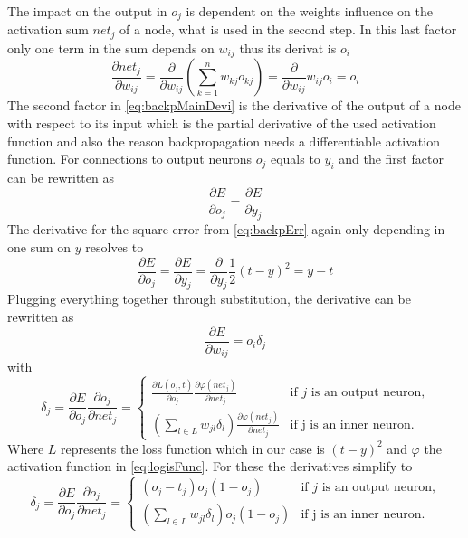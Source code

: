 The impact on the output in $o_j$ is dependent on the weights influence on the activation sum $net_j$ of a node, what is used in the second step. In this last factor only one term in the sum depends on $w_{ij}$ thus its derivat is $o_i$
\begin{equation}\label{eq:backp3s}
  \frac{\partial net_j}{\partial w_{ij}} =  \frac{\partial}{\partial w_{ij}} \left( \sum_{k=1}^n w_{kj} o_{kj} \right) = \frac{\partial}{\partial w_{ij}} w_{ij}o_i = o_i
\end{equation}
The second factor in \autoref{eq:backpMainDevi} is the derivative of the output of a node with respect to its input which is the partial derivative of the used activation function and also the reason backpropagation needs a differentiable activation function.
\newline
For connections to output neurons $o_j$ equals to $y_i$ and the first factor can be rewritten as
\begin{equation}
  \frac{\partial E}{\partial o_j} = \frac{\partial E}{\partial y_j} 
\end{equation}
The derivative for the square error from \autoref{eq:backpErr} again only depending in one sum on $y$ resolves to
\begin{equation}\label{eq:backpResEDev}
  \frac{\partial E}{\partial o_j} = \frac{\partial E}{\partial y_j} =
  \frac{\partial}{\partial y_j} \frac{1}{2}(t-y)^2 = y - t 
\end{equation}
Plugging everything together through substitution, the derivative can be rewritten as 
\begin{equation}
  \frac{\partial E}{\partial w_{ij}} = o_i \delta_j
\end{equation}
with
\begin{equation}
  \delta_j = \frac{\partial E}{\partial o_j}\frac{\partial o_j}{\partial net_j} =
  \begin{cases}
    \frac{\partial L(o_j,t)}{\partial o_j}\frac{\partial \varphi (net_j)}{\partial net_j} & \text{if $j$ is an output neuron,}\\
    (\sum_{l \in L} w_{jl}\delta_l ) \frac{\partial \varphi(net_j)}{\partial net_j} & \text{if j is an inner neuron.}
  \end{cases}
\end{equation}
Where $L$ represents the loss function which in our case is $(t-y)^2$ and $\varphi$ the activation function in \autoref{eq:logisFunc}. For these the derivatives simplify to
\begin{equation}
  \delta_j = \frac{\partial E}{\partial o_j}\frac{\partial o_j}{\partial net_j} =
  \begin{cases}
    (o_j - t_j) o_j (1-o_j) & \text{if $j$ is an output neuron,}\\
    (\sum_{l \in L} w_{jl}\delta_l ) o_j (1-o_j) & \text{if j is an inner neuron.}
  \end{cases}
\end{equation}
